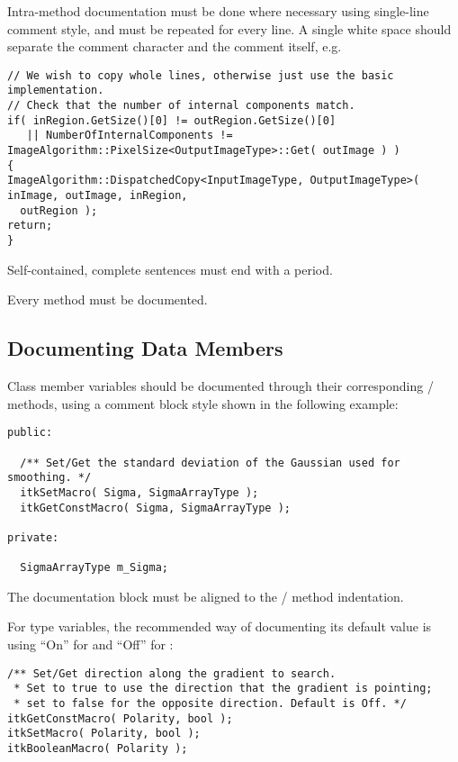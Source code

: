 Intra-method documentation must be done where necessary using single-line comment
style, and must be repeated for every line. A single white space should separate
the comment character \code{//} and the comment itself, e.g.

\small
\begin{verbatim}
// We wish to copy whole lines, otherwise just use the basic implementation.
// Check that the number of internal components match.
if( inRegion.GetSize()[0] != outRegion.GetSize()[0]
   || NumberOfInternalComponents != ImageAlgorithm::PixelSize<OutputImageType>::Get( outImage ) )
{
ImageAlgorithm::DispatchedCopy<InputImageType, OutputImageType>( inImage, outImage, inRegion,
  outRegion );
return;
}
\end{verbatim}
\normalsize

Self-contained, complete sentences must end with a period.

Every method must be documented.


\subsection{Documenting Data Members}
\label{subsec:DocumentingDataMembers}

Class member variables should be documented through their corresponding
/ methods, using a comment block style shown in
the following example:

\small
\begin{verbatim}
public:

  /** Set/Get the standard deviation of the Gaussian used for smoothing. */
  itkSetMacro( Sigma, SigmaArrayType );
  itkGetConstMacro( Sigma, SigmaArrayType );

private:

  SigmaArrayType m_Sigma;

\end{verbatim}
\normalsize

The documentation block must be aligned to the /
method indentation.

For  type variables, the recommended way of documenting its default
value is using ``On'' for  and ``Off'' for :

\small
\begin{verbatim}
/** Set/Get direction along the gradient to search.
 * Set to true to use the direction that the gradient is pointing;
 * set to false for the opposite direction. Default is Off. */
itkGetConstMacro( Polarity, bool );
itkSetMacro( Polarity, bool );
itkBooleanMacro( Polarity );
\end{verbatim}
\normalsize

